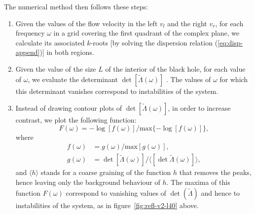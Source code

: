\documentclass[12pt]{article}
\begin{document}
The numerical method then follows these steps:

\begin{enumerate}
\item Given the values of the flow velocity in the left $v_l$ and the right $v_r$, for each frequency $\omega$ in a grid covering the first quadrant
of the complex plane, we calculate its
associated $k$-roots [by solving the dispersion relation
(\ref{eq:disp-append})] in both regions.
\item Given the value of the size $L$ of the interior of the  black hole, for each value of $\omega$, we evaluate the determinant $\det[\tilde\Lambda(\omega)]$ . The values of $\omega$ for which this determinant vanishes correspond to instabilities of the system.

\item Instead of drawing contour plots of $\det[\tilde\Lambda(\omega)]$, in order to increase contrast, we plot the following function:
\begin{equation}
F(\omega)=-\log[f(\omega)]/\text{max}\{-\log[f(\omega)]\},
\end{equation}
where
\begin{align}
f(\omega)&= g(\omega)/\text{max}[g(\omega)],
\nonumber\\
g(\omega)&=
\det[\tilde\Lambda(\omega)]/\langle[\det\tilde\Lambda(\omega)]\rangle,
\end{align}
and $\langle h\rangle$ stands for a coarse graining of the function $h$ that removes the peaks, hence leaving only the background behaviour of $h$.  The maxima of this function $F(\omega)$ correspond to vanishing values of $\det(\tilde \Lambda)$ and hence to instabilities  of the system, as in figure~\ref{fig:refl-v2-l40} above.
\end{enumerate}
\end{document}
